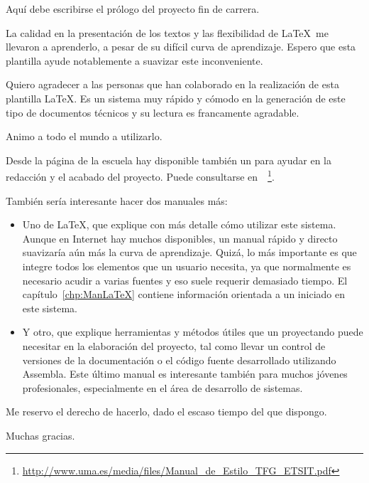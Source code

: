 

  Aquí debe escribirse el prólogo del proyecto fin de carrera.
  \medskip
  
  La calidad en la presentación de los textos y las flexibilidad de \LaTeX\ me llevaron a aprenderlo, a pesar de su difícil curva de aprendizaje.\nli
  Espero que esta plantilla ayude notablemente a suavizar este inconveniente.
  
  Quiero agradecer a las personas que han colaborado en la realización de esta plantilla \LaTeX. Es un sistema muy rápido y cómodo en la generación de este tipo de documentos técnicos y su lectura es francamente agradable.
  
  Animo a todo el mundo a utilizarlo.
  
  Desde la página de la escuela hay disponible también un  para ayudar en la redacción y el acabado del proyecto.
  Puede consultarse en~\cite{GuiaEstilo}~\footnote{
    \url{http://www.uma.es/media/files/Manual_de_Estilo_TFG_ETSIT.pdf}
  }.

  También sería interesante hacer dos manuales más: 
\begin{itemize}
  \item{Uno de \LaTeX, que explique con más detalle cómo utilizar este sistema. Aunque en Internet hay muchos disponibles, un manual rápido y directo suavizaría aún más la curva de aprendizaje.\nli
    Quizá, lo más importante es que integre todos los elementos que un usuario necesita, ya que normalmente es necesario acudir a varias fuentes y eso suele requerir demasiado tiempo.\nli
    El capítulo~\ref{chp:ManLaTeX} contiene información orientada a un iniciado en este sistema.}
  
  \item{Y otro, que explique herramientas y métodos útiles que un proyectando puede necesitar en la elaboración del proyecto, tal como llevar un control de versiones de la documentación o el código fuente desarrollado utilizando Assembla\TM. Este último manual es interesante también para muchos jóvenes profesionales, especialmente en el área de desarrollo de sistemas.}
\end{itemize}

  Me reservo el derecho de hacerlo, dado el escaso tiempo del que dispongo.
  \bigskip
  
  Muchas gracias.

\chapterend
